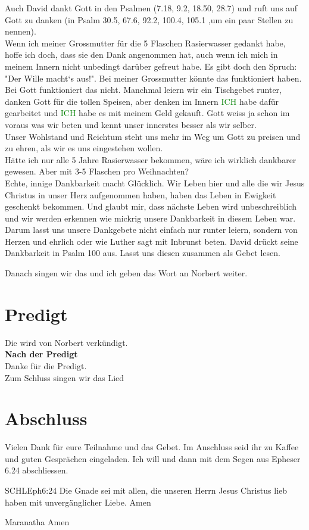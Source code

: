 \documentclass{../inc/mybib}
\begin{document}
\begin{spacing}{1.5}
Auch David dankt Gott in den Psalmen (7.18, 9.2, 18.50, 28.7) und ruft uns auf Gott zu danken (in Psalm 30.5, 67.6, 92.2, 100.4, 105.1 ,um ein paar Stellen zu nennen).\\
Wenn ich meiner Grossmutter für die 5 Flaschen Rasierwasser gedankt habe, hoffe ich doch, dass sie den Dank angenommen hat, auch wenn ich mich in meinem Innern nicht unbedingt darüber gefreut habe. Es gibt doch den Spruch: "Der Wille macht`s aus!". Bei meiner Grossmutter könnte das funktioniert haben. Bei Gott funktioniert das nicht. Manchmal leiern wir ein Tischgebet runter, danken Gott für die tollen Speisen, aber denken im Innern \textcolor{green}{ICH} habe dafür gearbeitet und \textcolor{green}{ICH} habe es mit meinem Geld gekauft. Gott weiss ja schon im voraus was wir beten und kennt unser innerstes besser als wir selber.\\ Unser Wohlstand und Reichtum steht uns mehr im Weg um Gott zu preisen und zu ehren, als wir es uns eingestehen wollen.\\ Hätte ich nur alle 5 Jahre Rasierwasser bekommen, wäre ich wirklich dankbarer gewesen. Aber mit 3-5  Flaschen pro Weihnachten?\\ Echte, innige Dankbarkeit macht Glücklich. Wir Leben hier und alle die wir Jesus Christus in unser Herz aufgenommen haben, haben das Leben in Ewigkeit geschenkt bekommen. Und glaubt mir, dass nächste Leben wird unbeschreiblich und wir werden erkennen wie mickrig unsere Dankbarkeit in diesem Leben war. Darum lasst uns unsere Dankgebete nicht einfach nur runter leiern, sondern von Herzen und ehrlich oder wie Luther sagt mit Inbrunst beten. David drückt seine Dankbarkeit in Psalm 100 aus. Lasst uns diesen zusammen als Gebet lesen.

Danach singen wir das  und ich geben das Wort an Norbert weiter.

\end{spacing}

\section{Predigt}
Die wird von Norbert verkündigt.\\

\textbf{Nach der Predigt}\\

Danke für die Predigt.\\

Zum Schluss singen wir das Lied 

\section{Abschluss}
Vielen Dank für eure Teilnahme und das Gebet. Im Anschluss seid ihr zu Kaffee und guten Gesprächen eingeladen.
Ich will \beten{} und dann mit dem Segen aus Epheser 6.24 abschliessen.
\begin{bibelbox}{SCHL}{Eph}{6:24}
Die Gnade sei mit allen, die unseren Herrn Jesus Christus lieb haben mit unvergänglicher Liebe. Amen
\end{bibelbox}
Maranatha Amen
\end{document}
